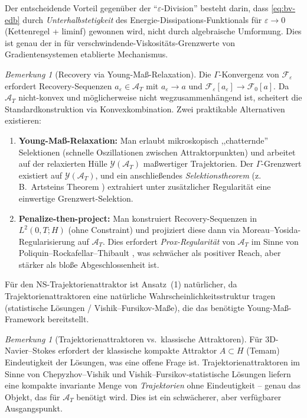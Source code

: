 \documentclass[12pt,a4paper]{article}
\theoremstyle{definition}
\theoremstyle{plain}
\theoremstyle{remark}
\newtheorem{remark}[definition]{Bemerkung}
\begin{document}
Der entscheidende Vorteil gegen\"uber der ``$\varepsilon$-Division'' besteht darin, dass \eqref{eq:bv-edb} durch \emph{Unterhalbstetigkeit} des Energie-Dissipations-Funktionals f\"ur $\varepsilon \to 0$ (Kettenregel + liminf) gewonnen wird, nicht durch algebraische Umformung. Dies ist genau der in \cite{MielkeRossiSavare2016} f\"ur verschwindende-Viskosit\"ats-Grenzwerte von Gradientensystemen etablierte Mechanismus.

\begin{remark}[Recovery via Young-Maß-Relaxation]\label{rem:young-measure}
Die $\Gamma$-Konvergenz von $\mathcal{F}_\varepsilon$ erfordert Recovery-Sequenzen $a_\varepsilon \in \mathcal{A}_T$ mit $a_\varepsilon \to a$ und $\mathcal{F}_\varepsilon[a_\varepsilon] \to \mathcal{F}_0[a]$. Da $\mathcal{A}_T$ nicht-konvex und m\"oglicherweise nicht wegzusammenh\"angend ist, scheitert die Standardkonstruktion via Konvexkombination. Zwei praktikable Alternativen existieren:
\begin{enumerate}
\item \textbf{Young-Maß-Relaxation:} Man erlaubt mikroskopisch ,,chatternde'' Selektionen (schnelle Oszillationen zwischen Attraktorpunkten) und arbeitet auf der relaxierten Hülle $\mathcal{Y}(\mathcal{A}_T)$ maßwertiger Trajektorien. Der $\Gamma$-Grenzwert existiert auf $\mathcal{Y}(\mathcal{A}_T)$, und ein anschließendes \emph{Selektionstheorem} (z.\,B.\ Artsteins Theorem \cite{Artstein1995}) extrahiert unter zusätzlicher Regularität eine einwertige Grenzwert-Selektion.
\item \textbf{Penalize-then-project:} Man konstruiert Recovery-Sequenzen in $L^2(0,T;H)$ (ohne Constraint) und projiziert diese dann via Moreau--Yosida-Regularisierung auf $\mathcal{A}_T$. Dies erfordert \emph{Prox-Regularit\"at} von $\mathcal{A}_T$ im Sinne von Poliquin--Rockafellar--Thibault \cite{PoliquinRockafellarThibault2000}, was schw\"acher als positiver Reach, aber st\"arker als blo{\ss}e Abgeschlossenheit ist.
\end{enumerate}
Für den NS-Trajektorienattraktor ist Ansatz~(1) natürlicher, da Trajektorienattraktoren eine natürliche Wahrscheinlichkeitsstruktur tragen (statistische Lösungen / Vishik--Fursikov-Maße), die das benötigte Young-Maß-Framework bereitstellt.
\end{remark}

\begin{remark}[Trajektorienattraktoren vs.\ klassische Attraktoren]\label{rem:trajectory-attractor}
F\"ur 3D-Navier--Stokes erfordert der klassische kompakte Attraktor $A \subset H$ (Temam) Eindeutigkeit der L\"osungen, was eine offene Frage ist. Trajektorienattraktoren im Sinne von Chepyzhov--Vishik \cite{ChepyzhovVishik2002} und Vishik--Fursikov-statistische L\"osungen liefern eine kompakte invariante Menge von \emph{Trajektorien} ohne Eindeutigkeit -- genau das Objekt, das f\"ur $\mathcal{A}_T$ ben\"otigt wird. Dies ist ein schw\"acherer, aber verf\"ugbarer Ausgangspunkt.
\end{remark}
\end{document}
